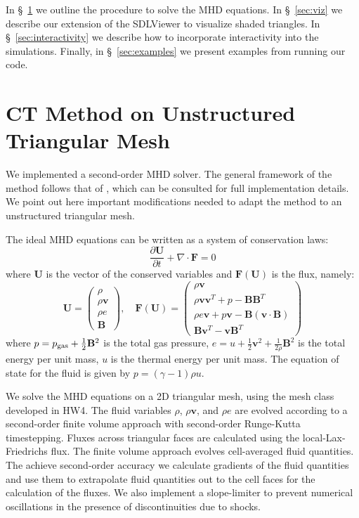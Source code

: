 \documentclass[12pt]{article}
\begin{document}
In \S~\ref{sec:ct} we outline the procedure to solve the MHD equations. In \S~\ref{sec:viz} we describe our extension of the SDLViewer to visualize shaded triangles. In \S~\ref{sec:interactivity} we describe how to incorporate interactivity into the simulations. Finally, in \S~\ref{sec:examples} we present examples from running our code.


\section{CT Method on Unstructured Triangular Mesh}\label{sec:ct}

We implemented a second-order MHD solver. The general framework of the method follows that of \cite{2014arXiv1402.5963M}, which can be consulted for full implementation details. We point out here important modifications needed to adapt the method to an unstructured triangular mesh.

The ideal MHD equations can be written as a system of conservation laws:
\begin{equation}
\frac{\partial \mathbf{U}}{\partial t} + \nabla \cdot \mathbf{F} = 0
\end{equation}
where $\mathbf{U}$ is the vector of the conserved variables and $\mathbf{F}(\mathbf{U})$ is the flux, namely:
\begin{equation}
\mathbf{U} = \begin{pmatrix} \rho \\ \rho\mathbf{v} \\ \rho e \\ \mathbf{B} \end{pmatrix},
\,\,\,\,\,\,
\mathbf{F}(\mathbf{U}) = 
\begin{pmatrix} \rho\mathbf{v} \\ \rho\mathbf{v}\mathbf{v}^T + p -\mathbf{B}\mathbf{B}^T \\ \rho e \mathbf{v} + p\mathbf{v} -\mathbf{B}(\mathbf{v}\cdot \mathbf{B}) \\ \mathbf{B}\mathbf{v}^T-\mathbf{v}\mathbf{B}^T \end{pmatrix}
\end{equation}
where $p=p_{\rm gas}+\frac{1}{2}\mathbf{B}^2$ is the total gas pressure, $e=u+\frac{1}{2}\mathbf{v}^2+\frac{1}{2\rho}\mathbf{B}^2$ is the total energy per unit mass, $u$ is the thermal energy per unit mass. The equation of state for the fluid is given by $p=(\gamma-1)\rho u$.

We solve the MHD equations on a 2D triangular mesh, using the mesh class developed in HW4. The fluid variables $\rho$, $\rho\mathbf{v}$, and $\rho e$ are evolved according to a second-order finite volume approach with second-order Runge-Kutta timestepping. Fluxes across triangular faces are calculated using the local-Lax-Friedrichs flux. The finite volume approach evolves cell-averaged fluid quantities. The achieve second-order accuracy we calculate gradients of the fluid quantities and use them to extrapolate fluid quantities out to the cell faces for the calculation of the fluxes. We also implement a slope-limiter to prevent numerical oscillations in the presence of discontinuities due to shocks.
\end{document}
